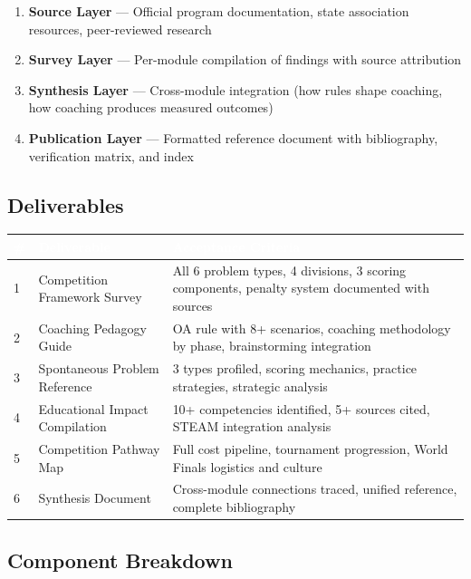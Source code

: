 \documentclass[11pt,letterpaper]{article}
\newcommand{\tableheader}[1]{\textbf{\sffamily\textcolor{white}{#1}}}
\begin{document}
\begin{enumerate}[leftmargin=2em]
\item \textbf{Source Layer} --- Official program documentation, state association resources, peer-reviewed research
\item \textbf{Survey Layer} --- Per-module compilation of findings with source attribution
\item \textbf{Synthesis Layer} --- Cross-module integration (how rules shape coaching, how coaching produces measured outcomes)
\item \textbf{Publication Layer} --- Formatted reference document with bibliography, verification matrix, and index
\end{enumerate}

\subsection{Deliverables}

\begin{center}
\begin{tabularx}{\textwidth}{C{0.5cm}L{4cm}X}
\toprule
{}
\tableheader{\#} & \tableheader{Deliverable} & \tableheader{Acceptance Criteria} \\
 & Competition Framework Survey & All 6 problem types, 4 divisions, 3 scoring components, penalty system documented with sources \\
2 & Coaching Pedagogy Guide & OA rule with 8+ scenarios, coaching methodology by phase, brainstorming integration \\
3 & Spontaneous Problem Reference & 3 types profiled, scoring mechanics, practice strategies, strategic analysis \\
4 & Educational Impact Compilation & 10+ competencies identified, 5+ sources cited, STEAM integration analysis \\
5 & Competition Pathway Map & Full cost pipeline, tournament progression, World Finals logistics and culture \\
6 & Synthesis Document & Cross-module connections traced, unified reference, complete bibliography \\
\bottomrule
\end{tabularx}
\end{center}

\subsection{Component Breakdown}
\end{document}
